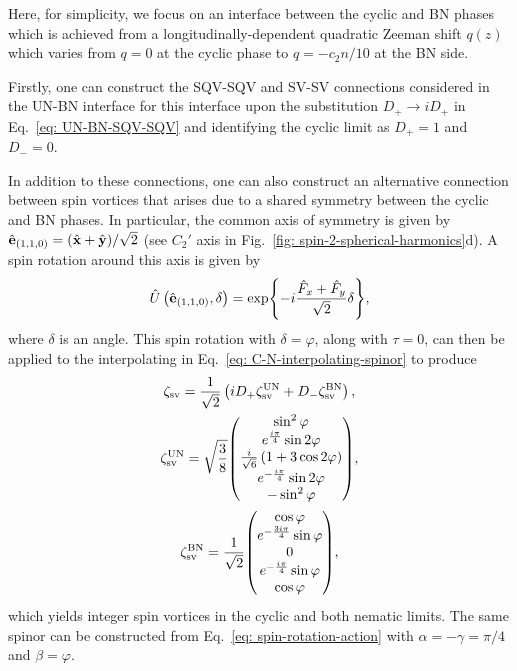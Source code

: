 Here, for simplicity, we focus on an interface between the cyclic and BN phases
which is achieved from a longitudinally-dependent quadratic Zeeman shift
\(q(z)\) which varies from \(q = 0\) at the cyclic phase to \(q = -c_2n/10\)
at the BN side.

Firstly, one can construct the SQV-SQV and SV-SV connections considered in the
UN-BN interface for this interface upon the substitution
\(D_+ \rightarrow iD_+\) in Eq.~\eqref{eq: UN-BN-SQV-SQV} and identifying the
cyclic limit as \(D_+ = 1\) and \(D_- = 0\).

In addition to these connections, one can also construct an alternative
connection between spin vortices that arises due to a shared symmetry between
the cyclic and BN phases.
In particular, the common axis of symmetry is given by \(\hat{\vb{e}}_{(1,1,0)}=
(\hat{\vb{x}} + \hat{\vb{y}}) / \sqrt{2}\) (see \(C_2'\) axis in
Fig.~\ref{fig: spin-2-spherical-harmonics}d).
A spin rotation around this axis is given by
\begin{equation}\label{eq: C-BN-sv-rot}
    \hat{U}\left(\hat{\vb{e}}_{(1,1,0)}, \delta\right) =
    \exp{-i\frac{\hat{F}_x + \hat{F}_y}{\sqrt{2}}\delta},
\end{equation}
where \(\delta \) is an angle.
This spin rotation with \(\delta = \varphi \), along with \(\tau=0\), can then
be applied to the interpolating in Eq.~\eqref{eq: C-N-interpolating-spinor} to
produce
\begin{gather}
    \zeta_\mathrm{sv} = \frac{1}{\sqrt{2}}\left(
    iD_+\zeta^\mathrm{UN}_\mathrm{sv} +
    D_-\zeta^\mathrm{BN}_\mathrm{sv}
    \right), \label{eq: C-BN-SV-SV-spinor} \\
    \zeta^\mathrm{UN}_\mathrm{sv} = \sqrt{\frac{3}{8}}
    \mqty(
    \sin^2 \varphi \\
    e^{\frac{i\pi }{4}} \sin 2\varphi \\
    \frac{i}{\sqrt{6}}\left(1 + 3\cos 2\varphi \right)\\
    e^{-\frac{i \pi }{4}} \sin2 \varphi \\
    -\sin^2 \varphi
    ), \\
    \zeta^\mathrm{BN}_\mathrm{sv} = \frac{1}{\sqrt{2}}
    \mqty(
    \cos \varphi \\
    e^{-\frac{3i\pi }{4}} \sin \varphi \\
    0\\
    e^{-\frac{i \pi }{4}} \sin \varphi \\
    \cos \varphi
    ),
\end{gather}
which yields integer spin vortices in the cyclic and both nematic limits.
The same spinor can be constructed from Eq.~\eqref{eq: spin-rotation-action}
with \(\alpha=-\gamma=\pi/4\) and \(\beta = \varphi \).

